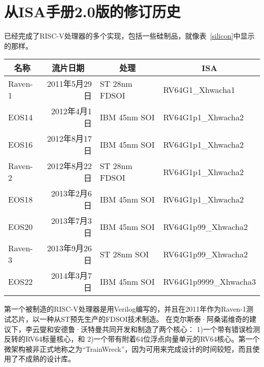 \section{从ISA手册2.0版的修订历史}

已经完成了RISC-V处理器的多个实现，包括一些硅制品，就像表~\ref{silicon}中显示的那样。

\begin{table*}[!h]
\begin{center}
\begin{tabular}{|l|r|l|l|}
\hline
\multicolumn{1}{|c|}{名称} & \multicolumn{1}{|c|}{流片日期} & \multicolumn{1}{|c|}{处理} & \multicolumn{1}{|c|}{ISA} \\ \hline
\hline
Raven-1 & 2011年5月29日 & ST 28nm FDSOI & RV64G1\_Xhwacha1 \\ \hline
EOS14 & 2012年4月1日 & IBM 45nm SOI & RV64G1p1\_Xhwacha2 \\ \hline
EOS16 & 2012年8月17日 & IBM 45nm SOI & RV64G1p1\_Xhwacha2 \\ \hline
Raven-2 & 2012年8月22日 & ST 28nm FDSOI & RV64G1p1\_Xhwacha2 \\ \hline
EOS18 & 2013年2月6日 & IBM 45nm SOI & RV64G1p1\_Xhwacha2 \\ \hline
EOS20 & 2013年7月3日 & IBM 45nm SOI & RV64G1p99\_Xhwacha2 \\ \hline
Raven-3 & 2013年9月26日 & ST 28nm SOI & RV64G1p99\_Xhwacha2 \\ \hline
EOS22 & 2014年3月7日 & IBM 45nm SOI & RV64G1p9999\_Xhwacha3 \\ \hline
\end{tabular}
\end{center}
\vspace{-0.15in}
\caption{已制造的RISC-V测试芯片。}
\label{silicon}
\end{table*}

第一个被制造的RISC-V处理器是用Verilog编写的，并且在2011年作为Raven-1测试芯片，以一种从ST预先生产的FDSOI技术制造。
在克尔斯泰·阿桑诺维奇的建议下，李云燮和安德鲁·沃特曼共同开发和制造了两个核心：
1)一个带有错误检测反转的RV64标量核心，和
2)一个带有附着64位浮点向量单元的RV64核心。第一个微架构被非正式地称之为“TrainWreck”，因为可用来完成设计的时间较短，而且使用了不成熟的设计库。

